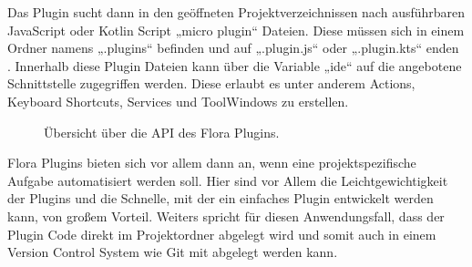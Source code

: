 Das Plugin sucht dann in den geöffneten Projektverzeichnissen
nach ausführbaren JavaScript oder Kotlin Script „micro plugin“ 
Dateien. Diese müssen sich in einem Ordner namens „.plugins“ 
befinden und auf „.plugin.js“ oder „.plugin.kts“ enden \cite{FloraPluginMarketplace}.
Innerhalb diese Plugin Dateien kann über die Variable „ide“ auf 
die angebotene Schnittstelle zugegriffen werden. Diese erlaubt 
es unter anderem Actions, Keyboard Shortcuts, Services und 
ToolWindows zu erstellen.

\begin{figure}
    \centering
    \caption{Übersicht über die API des Flora Plugins.}
    \label{fig:FloraPluginAPI}
\end{figure}    
 
Flora Plugins bieten sich vor allem dann an, wenn eine projektspezifische 
Aufgabe automatisiert werden soll. Hier sind vor Allem die 
Leichtgewichtigkeit der Plugins und die Schnelle, mit der ein 
einfaches Plugin entwickelt werden kann, von großem Vorteil. 
Weiters spricht für diesen Anwendungsfall, dass der Plugin Code 
direkt im Projektordner abgelegt wird und somit auch in einem Version 
Control System wie Git mit abgelegt werden kann.


